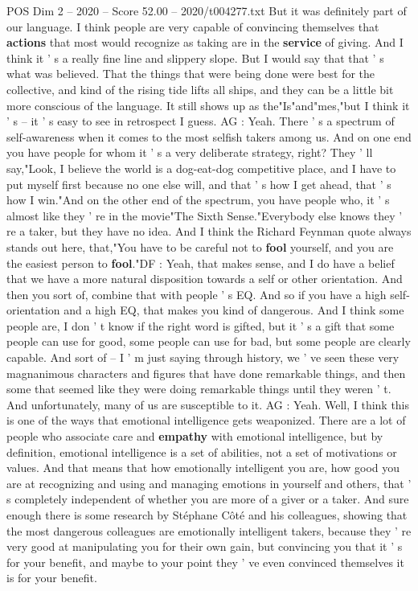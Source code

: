 \begin{textsample}{POS Dim 2 – 2020 – Score 52.00 – 2020/t004277.txt}
But it was definitely part of our language.
I think people are very capable of convincing themselves that \textbf{actions} that most would recognize as taking are in the \textbf{service} of giving.
And I think it ' s a really fine line and slippery slope.
But I would say that that ' s what was believed.
That the things that were being done were best for the collective, and kind of the rising tide lifts all ships, and they can be a little bit more conscious of the language.
It still shows up as the"Is"and"mes,"but I think it ' s -- it ' s easy to see in retrospect I guess.
AG : Yeah.
There ' s a spectrum of self-awareness when it comes to the most selfish takers among us.
And on one end you have people for whom it ' s a very deliberate strategy, right?
They ' ll say,"Look, I believe the world is a dog-eat-dog competitive place, and I have to put myself first because no one else will, and that ' s how I get ahead, that ' s how I win."And on the other end of the spectrum, you have people who, it ' s almost like they ' re in the movie"The Sixth Sense."Everybody else knows they ' re a taker, but they have no idea.
And I think the Richard Feynman quote always stands out here, that,"You have to be careful not to \textbf{fool} yourself, and you are the easiest person to \textbf{fool}."DF : Yeah, that makes sense, and I do have a belief that we have a more natural disposition towards a self or other orientation.
And then you sort of, combine that with people ' s EQ.
And so if you have a high self-orientation and a high EQ, that makes you kind of dangerous.
And I think some people are, I don ' t know if the right word is gifted, but it ' s a gift that some people can use for good, some people can use for bad, but some people are clearly capable.
And sort of -- I ' m just saying through history, we ' ve seen these very magnanimous characters and figures that have done remarkable things, and then some that seemed like they were doing remarkable things until they weren ' t.
And unfortunately, many of us are susceptible to it.
AG : Yeah.
Well, I think this is one of the ways that emotional intelligence gets weaponized.
There are a lot of people who associate care and \textbf{empathy} with emotional intelligence, but by definition, emotional intelligence is a set of abilities, not a set of motivations or values.
And that means that how emotionally intelligent you are, how good you are at recognizing and using and managing emotions in yourself and others, that ' s completely independent of whether you are more of a giver or a taker.
And sure enough there is some research by Stéphane Côté and his colleagues, showing that the most dangerous colleagues are emotionally intelligent takers, because they ' re very good at manipulating you for their own gain, but convincing you that it ' s for your benefit, and maybe to your point they ' ve even convinced themselves it is for your benefit.

\end{textsample}
